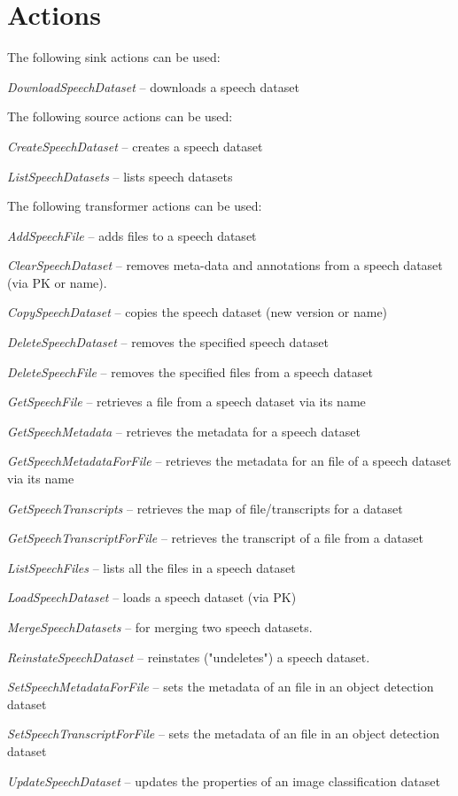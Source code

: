 \documentclass[a4paper]{book}
\begin{document}
\section{Actions}
The following sink actions can be used:
\begin{tight_itemize}
  \item \textit{DownloadSpeechDataset} -- downloads a speech dataset
\end{tight_itemize}
The following source actions can be used:
\begin{tight_itemize}
  \item \textit{CreateSpeechDataset} -- creates a speech dataset
  \item \textit{ListSpeechDatasets} -- lists speech datasets
\end{tight_itemize}
The following transformer actions can be used:
\begin{tight_itemize}
  \item \textit{AddSpeechFile} -- adds files to a speech dataset
  \item \textit{ClearSpeechDataset} -- removes meta-data and annotations from a speech dataset (via PK or name).
  \item \textit{CopySpeechDataset} -- copies the speech dataset (new version or name)
  \item \textit{DeleteSpeechDataset} -- removes the specified speech dataset
  \item \textit{DeleteSpeechFile} -- removes the specified files from a speech dataset
  \item \textit{GetSpeechFile} -- retrieves a file from a speech dataset via its name
  \item \textit{GetSpeechMetadata} -- retrieves the metadata for a speech dataset
  \item \textit{GetSpeechMetadataForFile} -- retrieves the metadata for an file of a speech dataset via its name
  \item \textit{GetSpeechTranscripts} -- retrieves the map of file/transcripts for a dataset
  \item \textit{GetSpeechTranscriptForFile} -- retrieves the transcript of a file from a dataset
  \item \textit{ListSpeechFiles} -- lists all the files in a speech dataset
  \item \textit{LoadSpeechDataset} -- loads a speech dataset (via PK)
  \item \textit{MergeSpeechDatasets} -- for merging two speech datasets.
  \item \textit{ReinstateSpeechDataset} -- reinstates ("undeletes") a speech dataset.
  \item \textit{SetSpeechMetadataForFile} -- sets the metadata of an file in an object detection dataset
  \item \textit{SetSpeechTranscriptForFile} -- sets the metadata of an file in an object detection dataset
  \item \textit{UpdateSpeechDataset} -- updates the properties of an image classification dataset
\end{tight_itemize}
\end{document}
